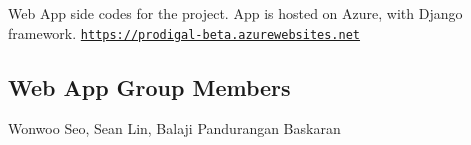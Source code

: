 Web App side codes for the project. App is hosted on Azure, with Django framework. \href{https://prodigal-beta.azurewebsites.net}{\tt https\+://prodigal-\/beta.\+azurewebsites.\+net}

\subsection*{Web App Group Members}

Wonwoo Seo, Sean Lin, Balaji Pandurangan Baskaran 